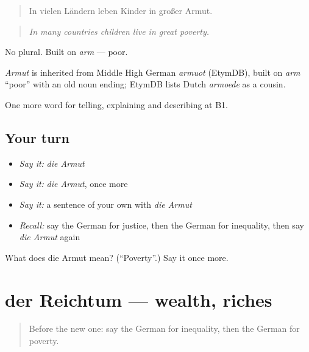 \begin{quote}
In vielen Ländern leben Kinder in großer Armut.
\end{quote}

\begin{quote}
\emph{In many countries children live in great poverty.}
\end{quote}

No plural. Built on \emph{arm} — poor.

\begin{cousinweb}
\emph{Armut} is inherited from Middle High German \emph{armuot} (EtymDB), built on \emph{arm} \textquotedblleft{}poor\textquotedblright{} with an old noun ending; EtymDB lists Dutch \emph{armoede} as a cousin.
\end{cousinweb}

\begin{grammarlens}[title={What you've built}]
One more word for telling, explaining and describing at B1.
\end{grammarlens}

\subsection*{Your turn}
\begin{itemize}
\raggedright
  \item \emph{Say it:} \emph{die Armut}
  \item \emph{Say it:} \emph{die Armut}, once more
  \item \emph{Say it:} a sentence of your own with \emph{die Armut}
  \item \emph{Recall:} say the German for justice, then the German for inequality, then say \emph{die Armut} again
\end{itemize}

\begin{tcolorbox}[breakable,colback=teal!4,colframe=teal!35!black,title={Before you move on}]
What does die Armut mean? (\textquotedblleft{}Poverty\textquotedblright{}.) Say it once more.
\end{tcolorbox}
\section[der Reichtum]{der Reichtum — wealth, riches}

\label{lesson:GE-C359-reichtum}



\begin{quote}
Before the new one: say the German for inequality, then the German for poverty.
\end{quote}

